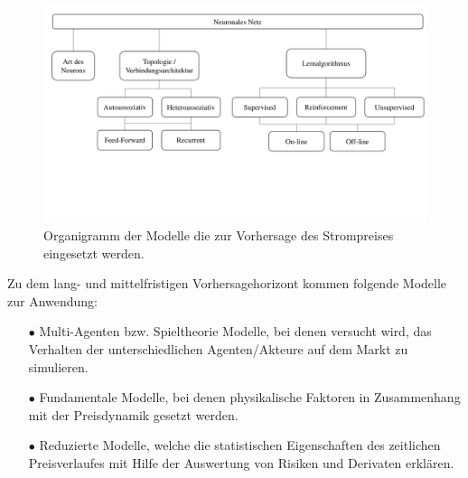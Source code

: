 \begin{figure}[!htb]
    \centering
        \includegraphics[page=2,width=1\textwidth]{Bilder/misc/ANN_Organigramme.pdf}
    \caption[Modelle die zur Vorhersage des Strompreises]{Organigramm der Modelle die zur Vorhersage des Strompreises eingesetzt werden.\,\protect\footnotemark{}}
    \label{fig:ann_vorhers._modelle}
\end{figure}
\addtocounter{footnote}{-1}     %
\addtocounter{Hfootnote}{-1}    %
\wrapfigfoot{}



Zu dem lang- und mittelfristigen Vorhersagehorizont kommen folgende Modelle zur Anwendung:
\begin{itemize}
\item[\textbf{$\bullet$}]%
Multi-Agenten bzw. Spieltheorie Modelle, bei denen versucht wird, das Verhalten der unterschiedlichen Agenten/Akteure auf dem Markt zu simulieren.

\item[\textbf{$\bullet$}]%
Fundamentale Modelle, bei denen physikalische Faktoren in Zusammenhang mit der Preisdynamik gesetzt werden.

\item[\textbf{$\bullet$}]%
Reduzierte Modelle, welche die statistischen Eigenschaften des zeitlichen Preisverlaufes mit Hilfe der Auswertung von Risiken und Derivaten erklären.
\end{itemize}


